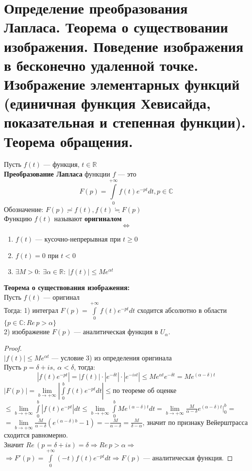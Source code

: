 \newpage
\section{Определение преобразования Лапласа. Теорема о существовании изображения. Поведение изображения в бесконечно удаленной точке. Изображение элементарных функций (единичная функция Хевисайда, показательная и степенная функции). Теорема обращения.}


Пусть $f(t)$ --- функция, $t \in \mathbb{R}$\\
\textbf{Преобразование Лапласа} функции $f$ --- это $$F(p)=\int\limits_{0}^{+\infty}f(t)e^{-pt}dt, p \in \mathbb{C}$$
Обозначение: $F(p)\risingdotseq f(t), f(t)\fallingdotseq F(p)$\\[2mm]
Функцию $f(t)$ называют \textbf{оригиналом}
$$\Leftrightarrow$$
\begin{enumerate}
    \item $f(t)$ --- кусочно-непрерывная при $t\geq 0$
    \item $f(t)=0$ при $t<0$
    \item $\exists M > 0: \ \exists \alpha \in \mathbb{R}: \ |f(t)|\leq M e^{\alpha t}$
\end{enumerate}


\textbf{Теорема о существования изображения:}\\[2mm]
Пусть $f(t)$ --- оригинал\\
Тогда: 1) интеграл $F(p)=\int\limits_{0}^{+\infty} f(t)e^{-pt}dt$ сходится абсолютно в области $\{p\in\mathbb{C}: Re\,p>\alpha\}$\\
2) изображение $F(p)$ --- аналитическая функция в $U_{\alpha}$.

\begin{proof}
    \ \\
    $|f(t)|\leq M e^{\alpha t}$ --- условие 3) из определения оригинала\\
    Пусть $p=\delta +i s, \ \alpha < \delta$, тогда:
    $$|f(t)e^{-pt}|=|f(t)|\cdot|e^{-\delta t}|\cdot |e^{-ist}|\leq M e^{\alpha t}e^{-\delta t}=Me^{(\alpha-\delta)t}$$
    $|F(p)|=\lim\limits_{b\to + \infty} \left| \int\limits_{0}^{b}f(t)e^{-pt}dt \right| \leq \text{по теореме об оценке}$\\
    $\leq \lim\limits_{b\to +\infty}\int\limits_{0}^{b}|f(t)e^{-pt}|dt \leq \lim\limits_{b\to +\infty}\int\limits_0^b Me^{(\alpha-\delta)t}dt = \lim\limits_{b\to +\infty}\frac{M}{\alpha-\delta}e^{(\alpha -\delta)t}|_0^b=$\\
    $=\lim\limits_{b\to +\infty}\frac{M}{\alpha-\delta}(e^{(\alpha-\delta)b}-1)=-\frac{M}{\alpha-\delta}=\frac{M}{\delta-\alpha}$, значит по признаку Вейерштрасса сходится равномерно.\\
    Значит $Re\,(p=\delta+i s)=\delta \Rightarrow Re \, p>\alpha \Rightarrow$\\
    $\Rightarrow F'(p)=\int\limits_0^{+\infty} (-t)f(t)e^{-pt}dt \Rightarrow F(p)$ --- аналитическая функция.  
\end{proof}

